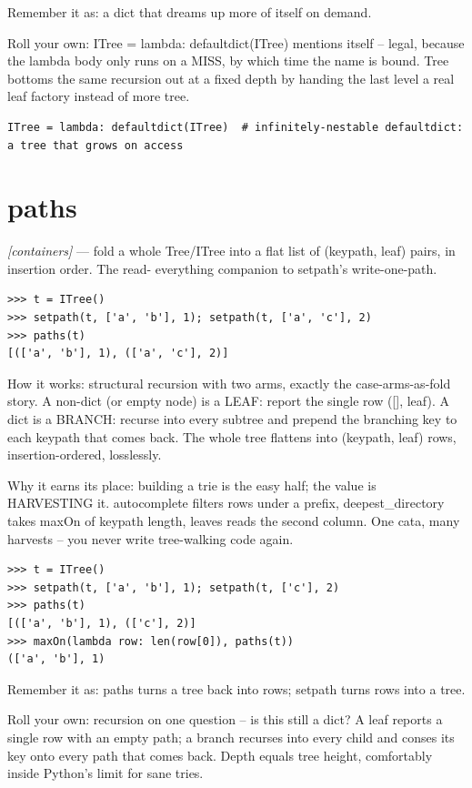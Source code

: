 \documentclass[11pt,letterpaper]{book}
\begin{document}
Remember it as: a dict that dreams up more of itself on demand.


Roll your own: ITree = lambda: defaultdict(ITree) mentions itself -- legal, because the lambda body only runs on a MISS, by which time the name is bound. Tree bottoms the same recursion out at a fixed depth by handing the last level a real leaf factory instead of more tree.

\begin{lstlisting}[style=code]
ITree = lambda: defaultdict(ITree)  # infinitely-nestable defaultdict: a tree that grows on access
\end{lstlisting}

\section{paths}
\noindent\textit{[containers]} --- fold a whole Tree/ITree into a flat list of (keypath, leaf) pairs, in insertion order. The read- everything companion to setpath's write-one-path.
\begin{lstlisting}[style=spec]
>>> t = ITree()
>>> setpath(t, ['a', 'b'], 1); setpath(t, ['a', 'c'], 2)
>>> paths(t)
[(['a', 'b'], 1), (['a', 'c'], 2)]
\end{lstlisting}

How it works: structural recursion with two arms, exactly the case-arms-as-fold story. A non-dict (or empty node) is a LEAF: report the single row ([], leaf). A dict is a BRANCH: recurse into every subtree and prepend the branching key to each keypath that comes back. The whole tree flattens into (keypath, leaf) rows, insertion-ordered, losslessly.


Why it earns its place: building a trie is the easy half; the value is HARVESTING it. autocomplete filters rows under a prefix, deepest\_directory takes maxOn of keypath length, leaves reads the second column. One cata, many harvests -- you never write tree-walking code again.

\begin{lstlisting}[style=spec]
>>> t = ITree()
>>> setpath(t, ['a', 'b'], 1); setpath(t, ['c'], 2)
>>> paths(t)
[(['a', 'b'], 1), (['c'], 2)]
>>> maxOn(lambda row: len(row[0]), paths(t))
(['a', 'b'], 1)
\end{lstlisting}

Remember it as: paths turns a tree back into rows; setpath turns rows into a tree.


Roll your own: recursion on one question -- is this still a dict? A leaf reports a single row with an empty path; a branch recurses into every child and conses its key onto every path that comes back. Depth equals tree height, comfortably inside Python's limit for sane tries.
\end{document}
